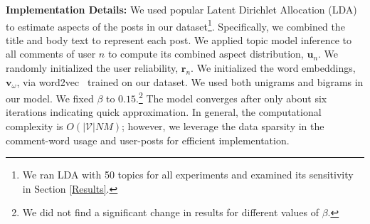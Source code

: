 \noindent
\textbf{Implementation Details:}
We used popular Latent Dirichlet Allocation (LDA)~\cite{blei2003latent} to estimate aspects of the posts in our dataset\footnote{We ran LDA with 50 topics for all experiments and examined its sensitivity in Section \ref{Results}.}. Specifically, we combined the title and body text to represent each post. We applied topic model inference to all comments of user $n$ to compute its combined aspect distribution, $\bm{u}_n$.
We randomly initialized the user reliability, $\bm{r}_n$. We initialized the word embeddings, $\bm{v}_\omega$, via word2vec~\cite{mikolov2013distributed} trained on our dataset. We used both unigrams and bigrams in our model. We fixed $\beta$ to $0.15$.\footnote{We did not find a significant change in results for different values of $\beta$.}
The model converges after only about six iterations indicating quick approximation.
In general, the computational complexity is $O(\vert \mathcal{V} \vert N M)$; however,
we leverage the data sparsity in the comment-word usage and user-posts for efficient implementation.
